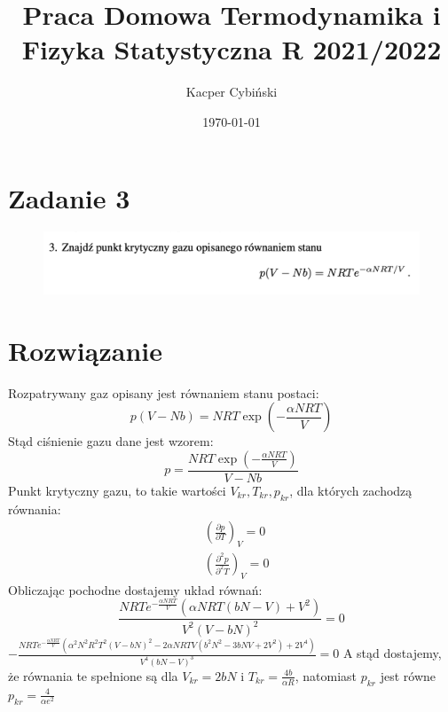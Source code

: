 \documentclass[12pt,a4paper]{article}
\title{Praca Domowa Termodynamika i Fizyka Statystyczna R 2021/2022}
\author{Kacper Cybiński}
\date{\today}
\begin{document}
\maketitle

\section{Zadanie 3}

\begin{figure}[h!]
    \includegraphics[width=\linewidth]{z3.png}
\end{figure}

\section{Rozwiązanie}

Rozpatrywany gaz opisany jest równaniem stanu postaci:
$$
p(V-N b)=N R T \exp \left(-\frac{\alpha N R T}{V}\right)
$$
Stąd ciśnienie gazu dane jest wzorem:
$$
p=\frac{N R T \exp \left(-\frac{\alpha N R T}{V}\right)}{V-N b}
$$
Punkt krytyczny gazu, to takie wartości $V_{k r}, T_{k r}, p_{k r}$, dla których zachodzą równania:
$$
\begin{aligned}
&\left(\frac{\partial p}{\partial T}\right)_{V}=0 \\
&\left(\frac{\partial^{2} p}{\partial^{2} T}\right)_{V}=0
\end{aligned}
$$
Obliczając pochodne dostajemy układ równań:
$$
\frac{N R T e^{-\frac{\alpha N R T}{V}}\left(\alpha N R T(b N-V)+V^{2}\right)}{V^{2}(V-b N)^{2}}=0
$$
$-\frac{N R T e^{-\frac{\alpha N R T}{V}}\left(\alpha^{2} N^{2} R^{2} T^{2}(V-b N)^{2}-2 \alpha N R T V\left(b^{2} N^{2}-3 b N V+2 V^{2}\right)+2 V^{4}\right)}{V^{4}(b N-V)^{3}}=0$
A stąd dostajemy, że równania te spełnione są dla $V_{k r}=2 b N$ i $T_{k r}=\frac{4 b}{\alpha R}$, natomiast $p_{k r}$ jest równe $p_{k r}=\frac{4}{\alpha e^{2}}$
\end{document}
